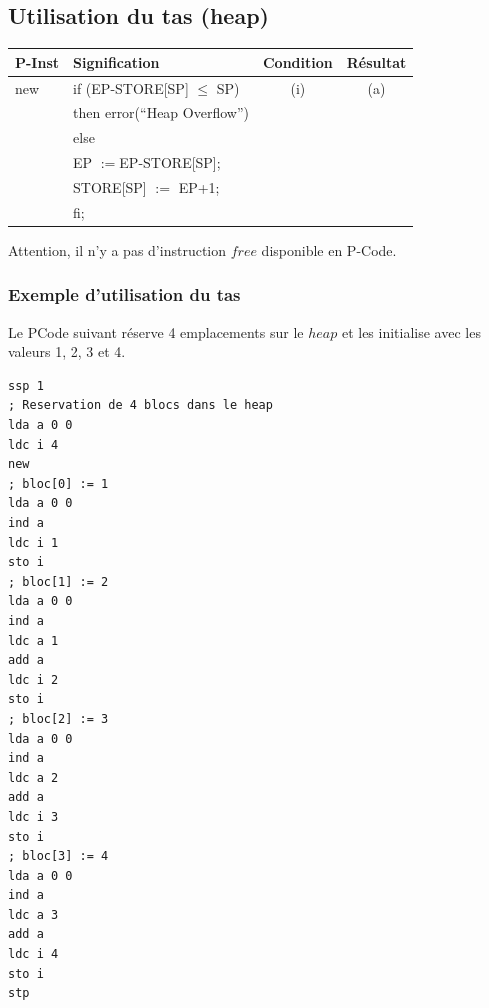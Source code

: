 \documentclass[french,11pt,twoside]{article}
\begin{document}
\subsection{Utilisation du tas (heap)}

\begin{tabular}{|l|l|c|c|}
\hline
P-Inst                     & Signification                                   & Condition      & Résultat \\
\hline
new                       & if (EP-STORE[SP] $\leq$ SP)              & (i)                  & (a) \\
                             & then error(``Heap Overflow'')           &                     & \\
                             & else                                                  &                     & \\
                             & \hspace{1cm}EP $:=$EP-STORE[SP]; &                     & \\
                             & \hspace{1cm}STORE[SP] $:=$ EP+1; &                     & \\
                             & fi;                                                     &                     & \\
\hline
\end{tabular}

Attention, il n'y a pas d'instruction $free$ disponible en P-Code.

\subsubsection{Exemple d'utilisation du tas}

Le PCode suivant réserve 4 emplacements sur le $heap$ et les initialise avec les valeurs 1, 2, 3 et 4.

\lstset{language=pcode,
breaklines=true,
showstringspaces=false,
frame=single
}
\begin{lstlisting}
ssp 1
; Reservation de 4 blocs dans le heap
lda a 0 0
ldc i 4
new
; bloc[0] := 1
lda a 0 0
ind a
ldc i 1
sto i
; bloc[1] := 2
lda a 0 0
ind a
ldc a 1
add a
ldc i 2
sto i
; bloc[2] := 3
lda a 0 0
ind a
ldc a 2
add a
ldc i 3
sto i
; bloc[3] := 4
lda a 0 0
ind a
ldc a 3
add a
ldc i 4
sto i
stp
\end{lstlisting}
\end{document}

